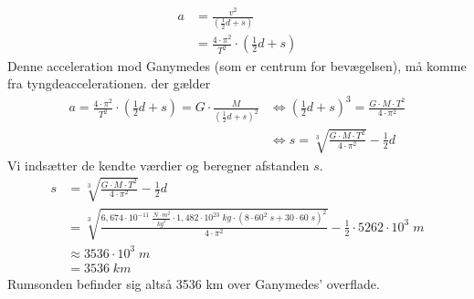 \documentclass{report}
\begin{document}
\begin{equation*}
\begin{split}
  a&=\frac{v^2}{\left(\frac{1}{2}d + s\right) }\\
  &=\frac{4 \cdot \pi ^2}{T^2}\cdot \left(\frac{1}{2}d + s\right) 
\end{split}
\end{equation*}
Denne acceleration mod Ganymedes (som er centrum for bevægelsen), må komme fra tyngdeaccelerationen.
 der gælder
\begin{equation*}
\begin{split}
  a=\frac{4 \cdot \pi ^2}{T^2}\cdot \left(\frac{1}{2}d + s\right)  = G \cdot \frac{M}{\left( \frac{1}{2}d + s\right)^2} &\iff \left(\frac{1}{2}d + s\right) ^3=\frac{G \cdot M \cdot T^2}{4 \cdot \pi ^2}\\
  &\iff s=\sqrt[3]{\frac{G \cdot M \cdot T^2}{4 \cdot \pi ^2}} - \frac{1}{2}d
\end{split}
\end{equation*}
Vi indsætter de kendte værdier og beregner afstanden $s$.
\begin{equation*}
\begin{split}
  s&=\sqrt[3]{\frac{G \cdot M \cdot T^2}{4 \cdot \pi ^2}} - \frac{1}{2}d\\
  &=\sqrt[3]{\frac{6,674 \cdot 10 ^{-11} \;\unit{\frac{N \cdot m^2}{kg^2}} \cdot 1,482 \cdot 10 ^{23}\;\unit{kg} \cdot \left(8 \cdot 60^2 \;\unit{s}  + 30 \cdot 60 \;\unit{s} \right)^2}{4 \cdot \pi ^2}} - \frac{1}{2} \cdot 5262 \cdot 10^3 \;\unit{m} \\
  &\approx 3536 \cdot 10^3 \;\unit{m} \\
  &=3536 \;\unit{km} 
\end{split}
\end{equation*}
Rumsonden befinder sig altså 3536 km over Ganymedes' overflade.
\end{document}
